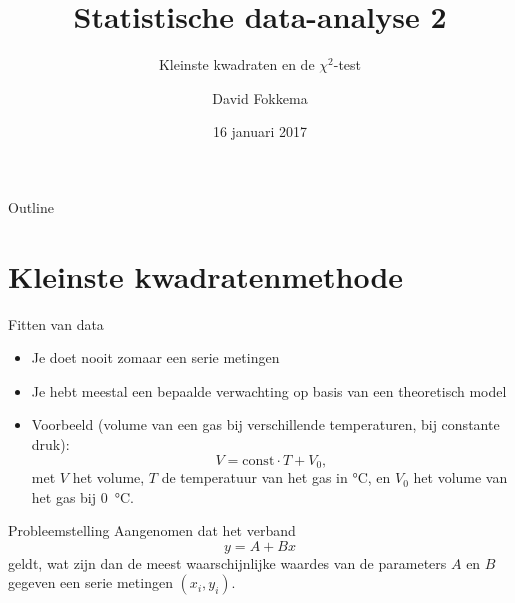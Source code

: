 \documentclass{beamer}
\title{Statistische data-analyse 2}
\subtitle{Kleinste kwadraten en de $\chi^2$-test}
\author{David Fokkema}
\institute{
  Practicum natuurkunde \\
  Vrije Universiteit / Universiteit van Amsterdam
}
\date{16 januari 2017}
\begin{document}
\begin{frame}
  \titlepage
\end{frame}

\begin{frame}{Outline}
  \tableofcontents
\end{frame}




\section{Kleinste kwadratenmethode}

\begin{frame}{Fitten van data}
  \begin{itemize}
    \item Je doet nooit zomaar een serie metingen
    \item Je hebt meestal een bepaalde verwachting op basis van een theoretisch model
    \item Voorbeeld (volume van een gas bij verschillende temperaturen, bij constante druk):
    \begin{equation*}
      V = \mathrm{const}\cdot T + V_0,
    \end{equation*}
    met $V$ het volume, $T$ de temperatuur van het gas in \si{\celsius}, en $V_0$ het volume van het gas bij \SI{0}{\celsius}.
  \end{itemize}
\end{frame}

\begin{frame}{Probleemstelling}
  Aangenomen dat het verband
  \begin{equation*}
    y = A + Bx
  \end{equation*}
  geldt, wat zijn dan de meest waarschijnlijke waardes van de parameters $A$ en $B$ gegeven een serie metingen $(x_i, y_i)$.
\end{frame}
\end{document}
